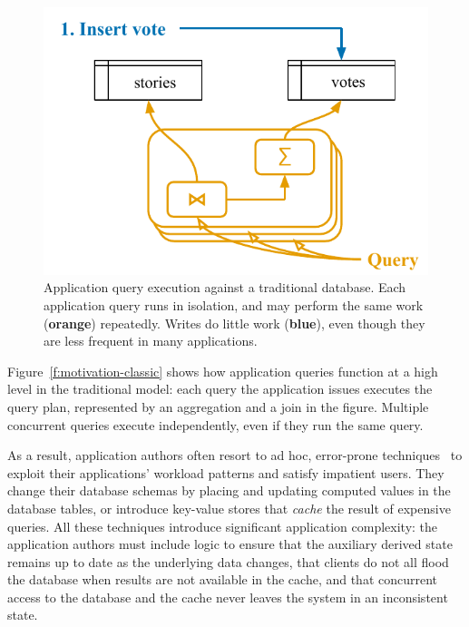 \begin{figure}
  \centering
  \includegraphics{diagrams/Motivation Classic DB.pdf}
  \caption{Application query execution against a traditional database. Each
  application query runs in isolation, and may perform the same work
  (\textbf{\color{set2}orange}) repeatedly. Writes do little work
  (\textbf{\color{set1}blue}), even though they are less frequent in many
  applications.}
  \label{f:motivation-classic}
\end{figure}

Figure~\vref{f:motivation-classic} shows how application queries function at a
high level in the traditional model: each query the application issues executes
the query plan, represented by an aggregation and a join in the figure. Multiple
concurrent queries execute independently, even if they run the same query.

As a result, application authors often resort to ad hoc, error-prone
techniques~\cite{ad-hoc-caching} to exploit their applications' workload
patterns and satisfy impatient users. They change their database schemas by
placing and updating computed values in the database tables, or introduce
key-value stores that \textit{cache} the result of expensive queries. All these
techniques introduce significant application complexity: the application authors
must include logic to ensure that the auxiliary derived state remains up to date
as the underlying data changes, that clients do not all flood the database when
results are not available in the cache, and that concurrent access to the
database and the cache never leaves the system in an inconsistent state.

